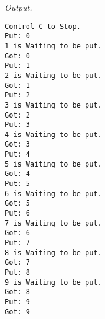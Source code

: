 \documentclass[12pt]{article}
\begin{document}
\textit{Output.}

\begin{lstlisting}
Control-C to Stop.
Put: 0
1 is Waiting to be put.
Got: 0
Put: 1
2 is Waiting to be put.
Got: 1
Put: 2
3 is Waiting to be put.
Got: 2
Put: 3
4 is Waiting to be put.
Got: 3
Put: 4
5 is Waiting to be put.
Got: 4
Put: 5
6 is Waiting to be put.
Got: 5
Put: 6
7 is Waiting to be put.
Got: 6
Put: 7
8 is Waiting to be put.
Got: 7
Put: 8
9 is Waiting to be put.
Got: 8
Put: 9
Got: 9
\end{lstlisting}


\end{document}
